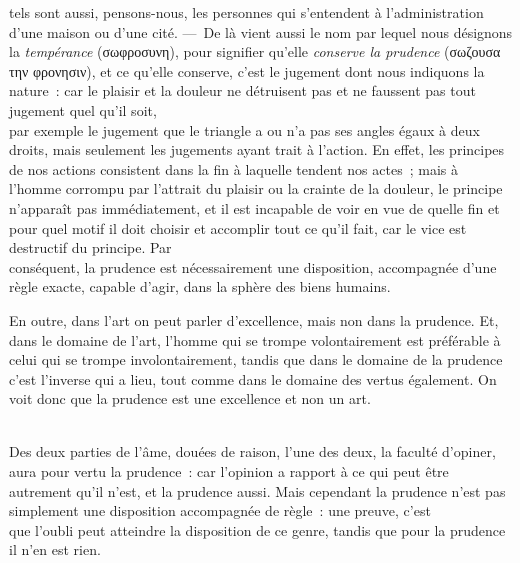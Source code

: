 \documentclass[french,twoside]{book} %
\begin{document}
tels sont aussi, pensons-nous, les personnes qui s’entendent à l’administration d’une maison ou d’une cité. — De là vient aussi le nom par lequel nous désignons la {\itshape tempérance} (σωφροσυνη), pour signifier qu’elle {\itshape conserve la prudence} (σωζουσα την φρονησιν), et ce qu’elle conserve, c’est le jugement dont nous indiquons la nature : car le plaisir et la douleur ne détruisent pas et ne faussent pas tout jugement quel qu’il soit, \\
par exemple le jugement que le triangle a ou n’a pas ses angles égaux à deux droits, mais seulement les jugements ayant trait à l’action. En effet, les principes de nos actions consistent dans la fin à laquelle tendent nos actes ; mais à l’homme corrompu par l’attrait du plaisir ou la crainte de la douleur, le principe n’apparaît pas immédiatement, et il est incapable de voir en vue de quelle fin et pour quel motif il doit choisir et accomplir tout ce qu’il fait, car le vice est destructif du principe. Par \\
conséquent, la prudence est nécessairement une disposition, accompagnée d’une règle exacte, capable d’agir, dans la sphère des biens humains.\par
En outre, dans l’art on peut parler d’excellence, mais non dans la prudence. Et, dans le domaine de l’art, l’homme qui se trompe volontairement est préférable à celui qui se trompe involontairement, tandis que dans le domaine de la prudence c’est l’inverse qui a lieu, tout comme dans le domaine des vertus également. On voit donc que la prudence est une excellence et non un art.\par
\\
Des deux parties de l’âme, douées de raison, l’une des deux, la faculté d’opiner, aura pour vertu la prudence : car l’opinion a rapport à ce qui peut être autrement qu’il n’est, et la prudence aussi. Mais cependant la prudence n’est pas simplement une disposition accompagnée de règle : une preuve, c’est \\
que l’oubli peut atteindre la disposition de ce genre, tandis que pour la prudence il n’en est rien.
\end{document}
